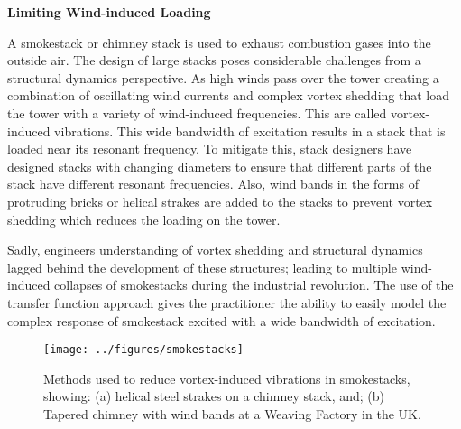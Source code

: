 \documentclass[12pt,letter]{article}
\begin{document}
\begin{example}

\end{example}


		\begin{vibration_case_study}

		\textbf{Limiting Wind-induced Loading}
			
		\noindent A smokestack or chimney stack is used to exhaust combustion gases into the outside air. The design of large stacks poses considerable challenges from a structural dynamics perspective. As high winds pass over the tower creating a combination of oscillating wind currents and complex vortex shedding that load the tower with a variety of wind-induced frequencies. This are called vortex-induced vibrations\protect\footnotemark[1]. This wide bandwidth of excitation results in a stack that is loaded near its resonant frequency. To mitigate this, stack designers have designed stacks with changing diameters to ensure that different parts of the stack have different resonant frequencies. Also, wind bands in the forms of protruding bricks or helical strakes are added to the stacks to prevent vortex shedding which reduces the loading on the tower.
			
			
		Sadly, engineers understanding of vortex shedding and structural dynamics lagged behind the development of these structures; leading to multiple wind-induced collapses of smokestacks during the industrial revolution.  The use of the transfer function approach gives the practitioner the ability to easily model the complex response of smokestack excited with a wide bandwidth of excitation. 
			
			\begin{figure}[H]
				\centering
				\texttt{[image: ../figures/smokestacks]}
				\caption{Methods used to reduce vortex-induced vibrations in smokestacks, showing: (a) helical steel strakes on a chimney stack\protect\footnotemark[2], and; (b) Tapered chimney with wind bands at a Weaving Factory in the UK\protect\footnotemark[3].}
			\end{figure}
			\noindent {}
		\end{vibration_case_study}
\end{document}
